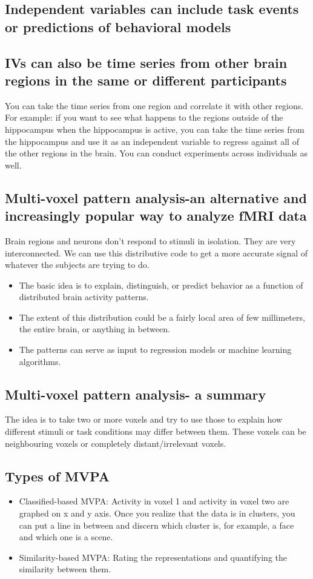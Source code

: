 \subsection{Independent variables can include task events or predictions of behavioral models}
\subsection{IVs can also be time series from other brain regions in the same or different participants}
You can take the time series from one region and correlate it with other regions. For example: if you want to see what happens to the regions outside of the hippocampus when the hippocampus is active, you can take the time series from the hippocampus and use it as an independent variable to regress against all of the other regions in the brain. You can conduct experiments across individuals as well.
\subsection{Multi-voxel pattern analysis-an alternative and increasingly popular way to analyze fMRI data}
Brain regions and neurons don't respond to stimuli in isolation. They are very interconnected. We can use this distributive code to get a more accurate signal of whatever the subjects are trying to do.
\begin{itemize}
    \item The basic idea is to explain, distinguish, or predict behavior as a function of distributed brain activity patterns.
    \item The extent of this distribution could be a fairly local area of few millimeters, the entire brain, or anything in between.
    \item The patterns can serve as input to regression models or machine learning algorithms.
\end{itemize}
\subsection{Multi-voxel pattern analysis- a summary}
The idea is to take two or more voxels and try to use those to explain how different stimuli or task conditions may differ between them. These voxels can be neighbouring voxels or completely distant/irrelevant voxels.
\subsection{Types of MVPA}
\begin{itemize}
    \item Classified-based MVPA: Activity in voxel 1 and activity in voxel two are graphed on x and y axis. Once you realize that the data is in clusters, you can put a line in between and discern which cluster is, for example, a face and which one is a scene.
    \item Similarity-based MVPA: Rating the representations and quantifying the similarity between them.
\end{itemize}
